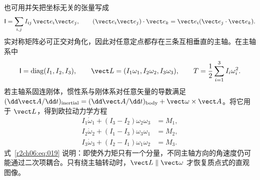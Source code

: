 也可用并矢把坐标无关的张量写成
\begin{equation}
 \mathsf I=\sum_{i,j}I_{ij}\,\vect e_i\vect e_j,\qquad
 (\vect e_i\vect e_j)\cdot\vect e_k
 =\vect e_i(\vect e_j\cdot\vect e_k).
 \label{r2ch06:eq:017}
\end{equation}
实对称矩阵必可正交对角化，因此对任意定点都存在三条互相垂直的主轴。在主轴系中
\begin{equation}
 \mathsf I=\operatorname{diag}(I_1,I_2,I_3),\qquad
 \vect L=(I_1\omega_1,I_2\omega_2,I_3\omega_3),\qquad
 T=\frac12\sum_{i=1}^3I_i\omega_i^2.
 \label{r2ch06:eq:018}
\end{equation}
若主轴系固连刚体，惯性系与刚体系对任意矢量的导数满足
$({\dd\vect A}/{\dd t})_{\rm inertial}=({\dd\vect A}/{\dd t})_{\rm body}+\vect\omega\times\vect A$。将它用于 $\vect L$，得到欧拉动力学方程
\begin{equation}
 \begin{aligned}
 I_1\dot\omega_1+(I_3-I_2)\omega_2\omega_3&=M_1,\\
 I_2\dot\omega_2+(I_1-I_3)\omega_3\omega_1&=M_2,\\
 I_3\dot\omega_3+(I_2-I_1)\omega_1\omega_2&=M_3.
 \end{aligned}
 \label{r2ch06:eq:019}
\end{equation}
式~\eqref{r2ch06:eq:019} 说明：即使外力矩只有一个分量，不同主轴方向的角速度仍可能通过二次项耦合。只有绕主轴转动时，$\vect L\parallel\vect\omega$ 才恢复质点式的直观图像。
